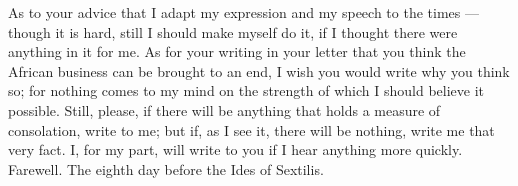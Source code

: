  As to your advice that I adapt my expression and my speech to the times --- though it is hard, still I should make myself do it, if I thought there were anything in it for me. As for your writing in your letter that you think the African business can be brought to an end, I wish you would write why you think so; for nothing comes to my mind on the strength of which I should believe it possible. Still, please, if there will be anything that holds a measure of consolation, write to me; but if, as I see it, there will be nothing, write me that very fact. I, for my part, will write to you if I hear anything more quickly. Farewell. The eighth day before the Ides of Sextilis.
